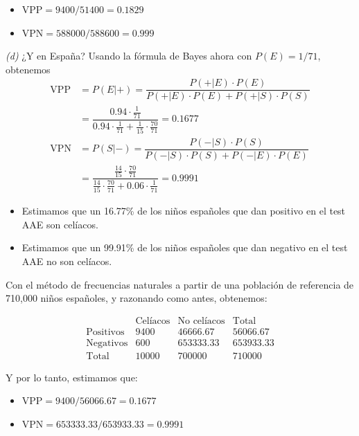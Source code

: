 \documentclass[
]{book}
\providecommand{\tightlist}{%
  \setlength{\itemsep}{0pt}\setlength{\parskip}{0pt}}
\theoremstyle{definition}
\theoremstyle{definition}
\theoremstyle{definition}
\theoremstyle{definition}
\theoremstyle{remark}
\begin{document}
\begin{itemize}
\item
  \(\text{VPP}= 9400/51400=0.1829\)
\item
  \(\text{VPN}= 588000/588600=0.999\)
\end{itemize}

\emph{(d)} ¿Y en España? Usando la fórmula de Bayes ahora con \(P(E)=1/71\), obtenemos
\[
\begin{array}{rl}
\text{VPP}\!\!\!\! & =P(E|+)=\dfrac{P(+|E)\cdot P(E)}{P(+|E)\cdot P(E)+P(+|S)\cdot P(S)}\\
&= \dfrac{0.94\cdot \frac{1}{71}}{0.94\cdot \frac{1}{71}+\frac{1}{15}\cdot \frac{70}{71}}=0.1677\\[1ex]
\text{VPN} \!\!\!\!& =P(S|-)=\dfrac{P(-|S)\cdot P(S)}{P(-|S)\cdot P(S)+P(-|E)\cdot P(E)}\\
&= \dfrac{\frac{14}{15}\cdot \frac{70}{71}}{\frac{14}{15}\cdot \frac{70}{71}+0.06\cdot \frac{1}{71}}=0.9991
\end{array}
\]

\begin{itemize}
\tightlist
\item
  Estimamos que un 16.77\% de los niños españoles que dan positivo en el test AAE son celíacos.
\item
  Estimamos que un 99.91\% de los niños españoles que dan negativo en el test AAE no son celíacos.
\end{itemize}

Con el método de frecuencias naturales a partir de una población de referencia de 710,000 niños españoles, y razonando como antes, obtenemos:

\[
\begin{array}{r|c|c|c}
& \text{Celíacos} & \text{No celíacos}  & \text{Total} \\ \hline
\text{Positivos} & 9400  &  46666.67 &  56066.67  \\ \hline
\text{Negativos} & 600  & 653333.33 &  653933.33  \\ \hline
\text{Total} &  10000 & 700000 & 710000
\end{array}
\]

Y por lo tanto, estimamos que:

\begin{itemize}
\item
  \(\text{VPP}= 9400/56066.67=0.1677\)
\item
  \(\text{VPN}= 653333.33/653933.33=0.9991\)
\end{itemize}
\end{document}
